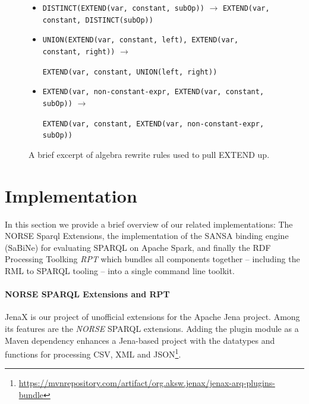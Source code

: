 \begin{figure}[!h]
\begin{itemize}
    \setlength\itemsep{-0.5em}
    \item \lstinline{DISTINCT(EXTEND(var, constant, subOp))} $\rightarrow$ \lstinline{EXTEND(var, constant, DISTINCT(subOp))}
    \item \lstinline{UNION(EXTEND(var, constant, left), EXTEND(var, constant, right))} $\rightarrow$

    \hspace{1cm}\lstinline{EXTEND(var, constant, UNION(left, right))}
    \item \lstinline{EXTEND(var, non-constant-expr, EXTEND(var, constant, subOp))} $\rightarrow$

    \hspace{1cm}\lstinline{EXTEND(var, constant, EXTEND(var, non-constant-expr, subOp))}
\end{itemize}
\vspace*{-5mm}
\caption{A brief excerpt of algebra rewrite rules used to pull EXTEND up.}
\label{fig:pull-extend}
\end{figure}

\section{Implementation}
\label{sec:implementation}
In this section we provide a brief overview of our related implementations: The NORSE Sparql Extensions, the implementation of the SANSA binding engine (SaBiNe) for evaluating SPARQL on Apache Spark, and finally the RDF Processing Toolking \emph{RPT} which bundles all components together -- including the RML to SPARQL tooling -- into a single command line toolkit.

\paragraph{NORSE SPARQL Extensions and RPT}
JenaX is our project of unofficial extensions for the Apache Jena project. Among its features are the \emph{NORSE} SPARQL extensions. Adding the plugin module as a Maven dependency enhances a Jena-based project with the datatypes and functions for processing CSV, XML and JSON\footnote{\url{https://mvnrepository.com/artifact/org.aksw.jenax/jenax-arq-plugins-bundle}}.


